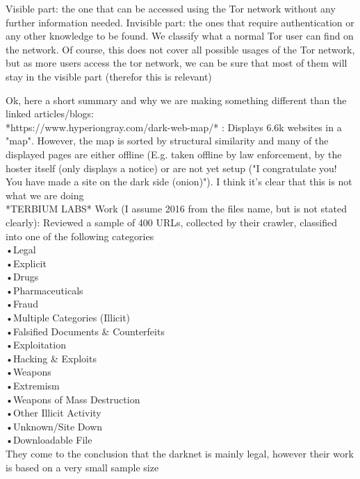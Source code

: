 
Visible part: the one that can be accessed using the Tor network without any further information needed. Invisible part: the ones that require authentication or any other knowledge to be found. We classify what a normal Tor user can find on the network. Of course, this does not cover all possible usages of the Tor network, but as more users access the tor network, we can be sure that most of them will stay in the visible part (therefor this is relevant)

Ok, here a short summary and why we are making something different than the linked articles/blogs: \\
*https://www.hyperiongray.com/dark-web-map/* : Displays 6.6k websites in a "map". However, the map is sorted by structural similarity and many of the displayed pages are either offline (E.g. taken offline by law enforcement, by the hoster itself (only displays a notice) or are not yet setup ("I congratulate you! You have made a site on the dark side (onion)"). I think it's clear that this is not what we are doing\\
*TERBIUM LABS* Work (I assume 2016 from the files name, but is not stated clearly): Reviewed a sample of 400 URLs, collected by their crawler, classified into one of the following categories\\
•Legal\\
•Explicit\\
•Drugs\\
•Pharmaceuticals\\
•Fraud\\
•Multiple Categories (Illicit)\\
•Falsified Documents & Counterfeits\\
•Exploitation\\
•Hacking & Exploits\\
•Weapons\\
•Extremism\\
•Weapons of Mass Destruction\\
•Other Illicit Activity \\
•Unknown/Site Down\\
•Downloadable File\\
They come to the conclusion that the darknet is mainly legal, however their work is based on a very small sample size\\
